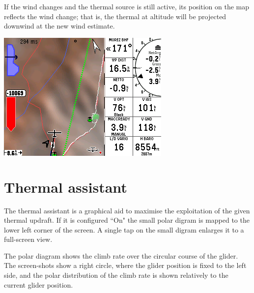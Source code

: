 \documentclass[a4paper,12pt]{refrep}
\begin{document}
If the wind changes and the thermal source is still active, its 
position on the map reflects the wind change; that is, the thermal 
at altitude will be projected downwind at the new wind estimate.

\begin{center}
\includegraphics[angle=0,width=0.8\linewidth,keepaspectratio='true']{figures/shot-tlocator-cruise.png}
\end{center}


\section{Thermal assistant}

The thermal assistant is a graphical aid to maximise the exploitation of the
given thermal updraft. If it is configured ``On"  the
small polar digram is mapped to the lower left corner of the screen. A
single tap on the small digram enlarges it to a full-screen view. 

The polar diagram shows the climb rate over the circular course of the glider.
The screen-shots show a right circle, where the glider position is fixed to the
left side, and the polar distribution of the climb rate is shown relatively to
the current glider position.
\end{document}
